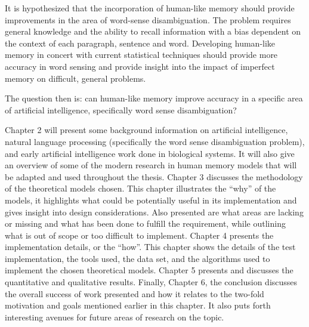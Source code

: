 It is hypothesized that the incorporation of human-like memory should provide improvements in the area of word-sense disambiguation. The problem requires general knowledge and the ability to recall information with a bias dependent on the context of each paragraph, sentence and word.  Developing human-like memory in concert with current statistical techniques should provide more accuracy in word sensing and provide insight into the impact of imperfect memory on difficult, general problems.

The question then is: can human-like memory improve accuracy in a specific area of artificial intelligence, specifically word sense disambiguation?

Chapter 2 will present some background information on artificial intelligence, natural language processing (specifically the word sense disambiguation problem), and early artificial intelligence work done in biological systems. It will also give an overview of some of the modern research in human memory models that will be adapted and used throughout the thesis.  Chapter 3 discusses the methodology of the theoretical models chosen. This chapter illustrates the ``why'' of the models, it highlights what could be potentially useful in its implementation and gives insight into design considerations.  Also presented are what areas are lacking or missing and what has been done to fulfill the requirement, while outlining what is out of scope or too difficult to implement.  Chapter 4 presents the implementation details, or the ``how''.  This chapter shows the details of the test implementation, the tools used, the data set, and the algorithms used to implement the chosen theoretical models.  Chapter 5 presents and discusses the quantitative and qualitative results. Finally, Chapter 6, the conclusion discusses the overall success of work presented and how it relates to the two-fold motivation and goals mentioned earlier in this chapter. It also puts forth interesting avenues for future areas of research on the topic.
